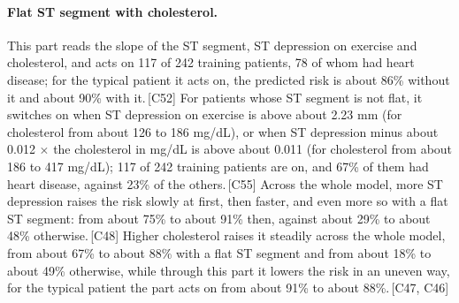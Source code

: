 \documentclass[a4paper,10pt]{article}
\newif\ifreviewmarks
\newcommand{\reviewrule}{\noindent{\color{BrickRed}\rule{\linewidth}{0.8pt}}}
\newenvironment{drafted}[1][]{%
  \ifreviewmarks\par\addvspace{\medskipamount}\reviewrule\par\nopagebreak
  \noindent{\color{BrickRed}\sffamily\footnotesize\textbf{Thesis Draft}\quad #1\hfill review}\par\nopagebreak\smallskip\fi}{%
  \ifreviewmarks\par\smallskip\noindent{\color{BrickRed}\sffamily\footnotesize end of thesis draft}\par\nopagebreak\reviewrule\par\medskip\fi}
\begin{document}
\begin{drafted}[plain-language layer: heart-s2-c1]
\paragraph{Flat ST segment with cholesterol.} This part reads the slope of the ST segment, ST depression on exercise and cholesterol, and acts on 117 of 242 training patients, 78 of whom had heart disease; for the typical patient it acts on, the predicted risk is about 86\% without it and about 90\% with it.\,{\scriptsize\textcolor{NavyBlue}{[C52]}} For patients whose ST segment is not flat, it switches on when ST depression on exercise is above about 2.23 mm (for cholesterol from about 126 to 186 mg/dL), or when ST depression minus about 0.012 $\times$ the cholesterol in mg/dL is above about 0.011 (for cholesterol from about 186 to 417 mg/dL); 117 of 242 training patients are on, and 67\% of them had heart disease, against 23\% of the others.\,{\scriptsize\textcolor{NavyBlue}{[C55]}} Across the whole model, more ST depression raises the risk slowly at first, then faster, and even more so with a flat ST segment: from about 75\% to about 91\% then, against about 29\% to about 48\% otherwise.\,{\scriptsize\textcolor{NavyBlue}{[C48]}} Higher cholesterol raises it steadily across the whole model, from about 67\% to about 88\% with a flat ST segment and from about 18\% to about 49\% otherwise, while through this part it lowers the risk in an uneven way, for the typical patient the part acts on from about 91\% to about 88\%.\,{\scriptsize\textcolor{NavyBlue}{[C47, C46]}}

\end{drafted}
\end{document}

